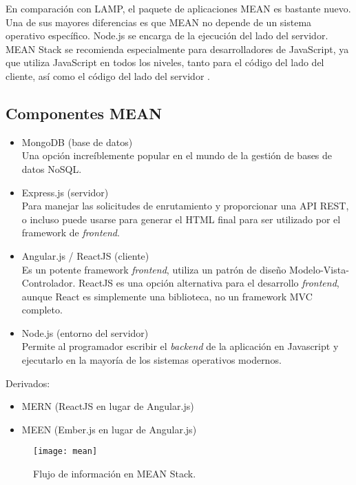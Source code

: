En comparación con LAMP, el paquete de aplicaciones MEAN es bastante nuevo. Una de sus mayores diferencias es que MEAN no depende de un sistema operativo específico. Node.js se encarga de la ejecución del lado del servidor. MEAN Stack se recomienda especialmente para desarrolladores de JavaScript, ya que utiliza JavaScript en todos los niveles, tanto para el código del lado del cliente, así como el código del lado del servidor \cite{srinivasan}.
\vspace{0.8cm}

\subsection{Componentes MEAN}
\begin{itemize}
  \item MongoDB (base de datos)\\
  Una opción increíblemente popular en el mundo de la gestión de bases de datos NoSQL.
  \item Express.js (servidor)\\
  Para manejar las solicitudes de enrutamiento y proporcionar una API REST, o incluso puede usarse para generar el HTML final para ser utilizado por el framework de \textit{frontend}.
  \item Angular.js / ReactJS (cliente)\\
  Es un potente framework \textit{frontend}, utiliza un patrón de diseño Modelo-Vista-Controlador. ReactJS es una opción alternativa para el desarrollo \textit{frontend}, aunque React es simplemente una biblioteca, no un framework MVC completo.
  \item Node.js (entorno del servidor)\\
  Permite al programador escribir el \textit{backend} de la aplicación en Javascript y ejecutarlo en la mayoría de los sistemas operativos modernos.
\end{itemize}

Derivados:

\begin{itemize}
  \item MERN (ReactJS en lugar de Angular.js)
  \item MEEN (Ember.js en lugar de Angular.js)
\end{itemize} 

\begin{figure}[H]
  \centering
  \texttt{[image: mean]}
  \caption{Flujo de información en MEAN Stack.}
\end{figure}

